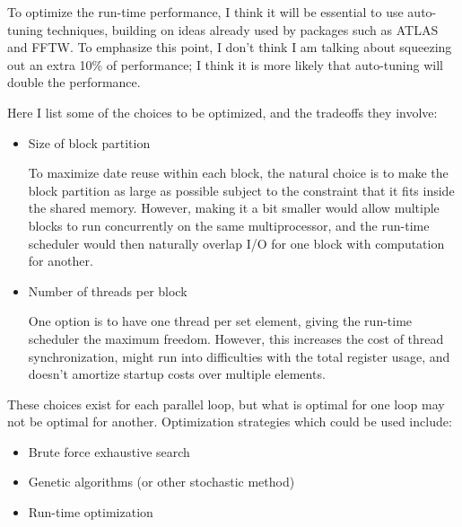 \documentclass[11pt]{article}
\begin{document}
To optimize the run-time performance, I think it will be essential
to use auto-tuning techniques, building on ideas already used by
packages such as ATLAS and FFTW.  To emphasize this point, I don't
think I am talking about squeezing out an extra 10\% of performance;
I think it is more likely that auto-tuning will double the performance.


Here I list some of the choices to be optimized, and the tradeoffs
they involve:
\begin{itemize}
\item
Size of block partition

To maximize date reuse within each block, the natural choice is
to make the block partition as large as possible subject to the
constraint that it fits inside the shared memory.  However,
making it a bit smaller would allow multiple blocks to run
concurrently on the same multiprocessor, and the run-time
scheduler would then naturally overlap I/O for one block
with computation for another.

\item
Number of threads per block

One option is to have one thread per set element, giving the
run-time scheduler the maximum freedom.  However, this increases
the cost of thread synchronization, might run into difficulties
with the total register usage, and doesn't amortize startup
costs over multiple elements.

\end{itemize}


These choices exist for each parallel loop, but what is optimal
for one loop may not be optimal for another.
Optimization strategies which could be used include:
\begin{itemize}
\item
Brute force exhaustive search

%

\item
Genetic algorithms (or other stochastic method)


\item
Run-time optimization


\end{itemize}
\end{document}
